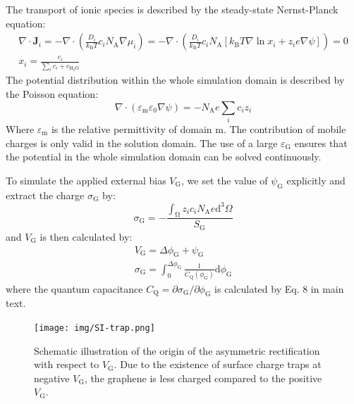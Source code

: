\documentclass[manuscript=suppinfo,email=true, hyperref=true, keywords=false]{achemso}
\begin{document}
The transport of ionic species is described by the steady-state
Nernst-Planck equation:
\begin{eqnarray}
  \label{eq:pnp}
  \nabla \cdot \boldsymbol{J}_{i} = -\nabla \cdot \left( \frac{D_{i}}{k_{\mathrm{B}}T} c_{i} N_{\mathrm{A}} \nabla \mu_{i}\right)
  = -\nabla \cdot \left( \frac{D_{i}}{k_{\mathrm{B}} T} c_{i} N_{\mathrm{A}}
  [k_{\mathrm{B}}T \nabla \ln x_{i} + z_{i} e \nabla \psi]\right) = 0\\
  x_{i} = \frac{c_{i}}{\sum_{i} c_{i} + c_{\mathrm{H_{2}O}}}
\end{eqnarray}
The potential distribution within the whole simulation domain is
described by the Poisson equation:
\begin{equation}
  \label{eq:poisson}
  \nabla \cdot (\varepsilon_{\mathrm{m}} \varepsilon_{0} \nabla \psi) = -N_{\mathrm{A}} e \sum_{i} c_{i}z_{i}
\end{equation}
Where $\varepsilon_{\mathrm{m}}$ is the relative permittivity of
domain m. The contribution of mobile charges is only valid in the
solution domain. The use of a large $\varepsilon_{\mathrm{G}}$ ensures
that the potential in the whole simulation domain can be solved
continuously. 

To simulate the applied external bias $V_{\mathrm{G}}$, we set the
value of $\psi_{\mathrm{G}}$ explicitly and extract the charge
$\sigma_{\mathrm{G}}$ by:
\begin{equation}
  \label{eq:sigma-G}
  \sigma_{\mathrm{G}} = - {\displaystyle \frac{\int_{\mathrm{\Omega}} z_{i} c_{i} N_{\mathrm{A}} e \mathrm{d}^{3} \Omega}{S_{\mathrm{G}}}}
\end{equation}
and $V_{\mathrm{G}}$ is then calculated by:
\begin{eqnarray}
  \label{eq:VG}
  V_{\mathrm{G}} = \Delta \phi_{\mathrm{G}} + \psi_{\mathrm{G}}\\
  \sigma_{\mathrm{G}} = \int_{0}^{\Delta \phi_{\mathrm{G}}} \frac{1}{C_{\mathrm{Q}}(\phi_{\mathrm{G}})} \mathrm{d} \phi_{\mathrm{G}}
\end{eqnarray}
where the quantum capacitance
$C_{\mathrm{Q}}=\partial \sigma_{\mathrm{G}}/\partial
\phi_{\mathrm{G}}$ is calculated by Eq. 8 in main text.

\begin{figure}[htbp]
  \centering
  \texttt{[image: img/SI-trap.png]}
  \caption{Schematic illustration of the origin of the asymmetric
    rectification with respect to $V_{\mathrm{G}}$. Due to the
    existence of surface charge traps at negative $V_{\mathrm{G}}$,
    the graphene is less charged compared to the positive
    $V_{\mathrm{G}}$.}
  \label{fig:trap}
\end{figure}
\end{document}
